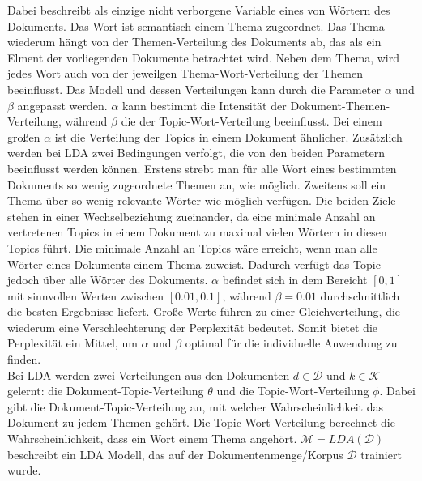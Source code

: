 \documentclass[german,version-2020-11]{uzl-thesis}
\begin{document}
Dabei beschreibt  als einzige nicht verborgene Variable eines von  Wörtern des Dokuments. Das Wort ist semantisch einem Thema  zugeordnet. Das Thema wiederum hängt von der Themen-Verteilung  des Dokuments ab, das als ein Elment der  vorliegenden Dokumente betrachtet wird. Neben dem Thema, wird jedes Wort auch von der jeweilgen Thema-Wort-Verteilung \mathcal{\phi} der  Themen beeinflusst. Das Modell und dessen Verteilungen kann durch die Parameter $\alpha$ und $\beta$ angepasst werden. $\alpha$ kann bestimmt die Intensität der Dokument-Themen-Verteilung, während $\beta$ die der Topic-Wort-Verteilung beeinflusst. Bei einem großen $\alpha$ ist die Verteilung der Topics in einem Dokument ähnlicher. Zusätzlich werden bei LDA zwei Bedingungen verfolgt, die von den beiden Parametern beeinflusst werden können. Erstens strebt man für alle Wort eines bestimmten Dokuments so wenig zugeordnete Themen an, wie möglich. Zweitens soll ein Thema über so wenig relevante Wörter wie möglich verfügen. Die beiden Ziele stehen in einer Wechselbeziehung zueinander, da eine minimale Anzahl an vertretenen Topics in einem Dokument zu maximal vielen Wörtern in diesen Topics führt. Die minimale Anzahl an Topics wäre erreicht, wenn man alle Wörter eines Dokuments einem Thema zuweist. Dadurch verfügt das Topic jedoch über alle Wörter des Dokuments. $\alpha$ befindet sich in dem Bereicht $[0,1]$ mit sinnvollen Werten zwischen $[0.01, 0.1]$, während $\beta =0.01$ durchschnittlich die besten Ergebnisse liefert. Große Werte führen zu einer Gleichverteilung, die wiederum eine Verschlechterung der Perplexität bedeutet. Somit bietet die Perplexität ein Mittel, um $\alpha$ und $\beta$ optimal für die individuelle Anwendung zu finden. \\

Bei LDA werden zwei Verteilungen aus den Dokumenten $d \in \mathcal{D}$ und $k \in \mathcal{K}$gelernt: die Dokument-Topic-Verteilung $\theta$ und die Topic-Wort-Verteilung $\phi$. Dabei gibt die Dokument-Topic-Verteilung an, mit welcher Wahrscheinlichkeit das Dokument zu jedem Themen gehört. Die Topic-Wort-Verteilung berechnet die Wahrscheinlichkeit, dass ein Wort einem Thema angehört. $\mathcal{M} = LDA(\mathcal{D})$ beschreibt ein LDA Modell, das auf der Dokumentenmenge/Korpus $\mathcal{D}$ trainiert wurde.
\end{document}

